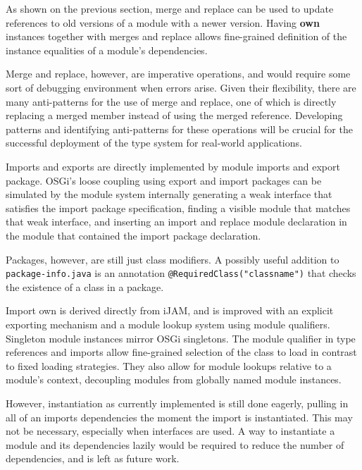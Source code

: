 As shown on the previous section, merge and replace can be used to 
update references to old versions of a module with a newer version.
Having \textbf{own} instances together with merges and replace allows
fine-grained definition of the instance equalities of a module's dependencies.

Merge and replace, however, are imperative operations, and would require
some sort of debugging environment when errors arise. Given their flexibility,
there are many anti-patterns for the use of merge and replace, one of which
is directly replacing a merged member instead of using the merged reference.
Developing patterns and identifying anti-patterns for these operations will be
crucial for the successful deployment of the type system for real-world applications.


Imports and exports are directly implemented by module imports and export package.
OSGi's loose coupling using export and import packages can be simulated by
the module system internally generating a weak interface that satisfies the import
package specification, finding a visible module that matches that weak interface, and
inserting an import and replace module declaration in the module that contained the import package
declaration.

Packages, however, are still just class modifiers. A possibly useful addition to 
\texttt{package-info.java} is an annotation \texttt{@RequiredClass("classname")}
that checks the existence of a class in a package.


Import own is derived directly from iJAM, and is improved with an explicit exporting 
mechanism and a module lookup system using module qualifiers. Singleton module instances mirror
OSGi singletons. The module qualifier in type references and
imports allow fine-grained selection of the class to load in contrast
to fixed loading strategies. They also allow for module lookups relative to
a module's context, decoupling modules from globally named module instances.

However, instantiation as currently implemented is still done eagerly, pulling in all
of an imports dependencies the moment the import is instantiated. This may not be necessary,
especially when interfaces are used. A way to instantiate a module and its dependencies 
lazily would be required to reduce the number of dependencies, and is left as future work.

